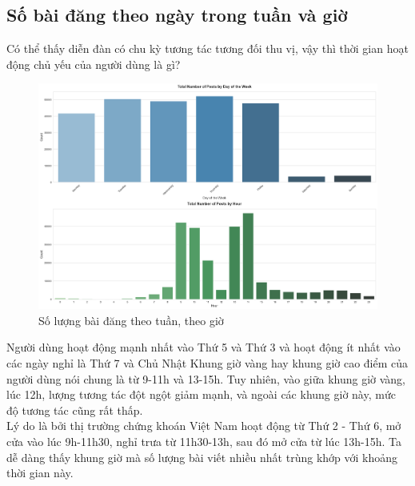 \subsection{Số bài đăng theo ngày trong tuần và giờ}
Có thể thấy diễn đàn có chu kỳ tương tác tương đối thu vị, vậy thì thời gian hoạt động chủ yếu của người dùng là gì?

\begin{figure}[H]
    \centering
    \includegraphics[width=1\linewidth]{images/plot-2.23-column_chart_merge.png}
    \caption{Số lượng bài đăng theo tuần, theo giờ}
    \label{fig:2.2}
\end{figure}
Người dùng hoạt động mạnh nhất vào Thứ 5 và Thứ 3 và hoạt động ít nhất vào các ngày nghỉ là Thứ 7 và Chủ Nhật Khung giờ vàng hay khung giờ cao điểm của người dùng nói chung là từ 9-11h và 13-15h. Tuy nhiên, vào giữa khung giờ vàng, lúc 12h, lượng tương tác đột ngột giảm mạnh, và ngoài các khung giờ này, mức độ tương tác cũng rất thấp. \\

Lý do là bởi thị trường chứng khoán Việt Nam hoạt động từ Thứ 2 - Thứ 6, mở cửa vào lúc 9h-11h30, nghỉ trưa từ 11h30-13h, sau đó mở cửa từ lúc 13h-15h. Ta dễ dàng thấy khung giờ mà số lượng bài viết nhiều nhất trùng khớp với khoảng thời gian này.

